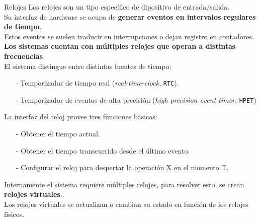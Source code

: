 \documentclass[aspectratio=169]{beamer}
\begin{document}
\begin{frame}{Relojes}
    \small
    Los relojes son un tipo específico de dipositivo de entrada/salida.\\
    \medskip
    Su interfaz de hardware se ocupa de \textbf{generar eventos en intervalos regulares de tiempo}.\\
    Estos eventos se suelen traducir en interrupciones o dejan registro en contadores.\\
    \medskip
    \textcolor{naranjauca}{\textbf{Los sistemas cuentan con múltiples relojes que operan a distintas frecuencias}}\\
    \medskip
    El sistema distingue entre distintas fuentes de tiempo:
    \begin{itemize}
    \setlength\itemsep{0cm}
    \item[$\cdot$] Temporizador de tiempo real (\emph{real-time-clock}, \texttt{RTC}).
    \item[$\cdot$] Temporizador de eventos de alta precisión (\emph{high precision event timer}, \texttt{HPET})
    \end{itemize}
    La interfaz del reloj provee tres funciones básicas:\\
    \begin{itemize}
    \setlength\itemsep{0cm}
    \item[-] Obtener el tiempo actual.
    \item[-] Obtener el tiempo transcurrido desde el último evento.
    \item[-] Configurar el reloj para despertar la operación X en el momento T.
    \end{itemize}
    \textcolor{verdeuca}{
    Internamente el sistema requiere múltiples relojes, para resolver esto, se crean \textbf{relojes virtuales}.\\
    Los relojes virtuales se actualizan o cambian su estado en función de los relojes físicos.}
\end{frame}
\end{document}
